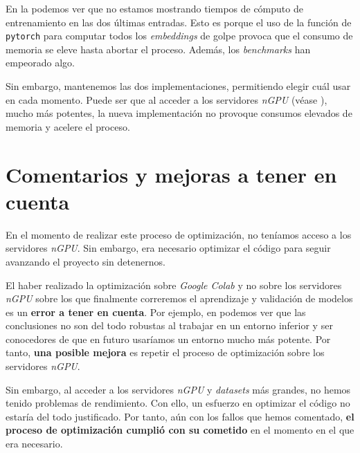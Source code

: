 En la  podemos ver que no estamos mostrando tiempos de cómputo de entrenamiento en las dos últimas entradas. Esto es porque el uso de la función de \lstinline{pytorch} para computar todos los \textit{embeddings} de golpe provoca que el consumo de memoria se eleve hasta abortar el proceso. Además, los \textit{benchmarks} han empeorado algo.

Sin embargo, mantenemos las dos implementaciones, permitiendo elegir cuál usar en cada momento. Puede ser que al acceder a los servidores \textit{nGPU} (véase ), mucho más potentes, la nueva implementación no provoque consumos elevados de memoria y acelere el proceso.

\section{Comentarios y mejoras a tener en cuenta}

En el momento de realizar este proceso de optimización, no teníamos acceso a los servidores \textit{nGPU}. Sin embargo, era necesario optimizar el código para seguir avanzando el proyecto sin detenernos.

El haber realizado la optimización sobre \textit{Google Colab} y no sobre los servidores \textit{nGPU} sobre los que finalmente correremos el aprendizaje y validación de modelos es un \textbf{error a tener en cuenta}. Por ejemplo, en  podemos ver que las conclusiones no son del todo robustas al trabajar en un entorno inferior y ser conocedores de que en futuro usaríamos un entorno mucho más potente. Por tanto, \textbf{una posible mejora} es repetir el proceso de optimización sobre los servidores \textit{nGPU}.

Sin embargo, al acceder a los servidores \textit{nGPU} y \textit{datasets} más grandes, no hemos tenido problemas de rendimiento. Con ello, un esfuerzo en optimizar el código no estaría del todo justificado. Por tanto, aún con los fallos que hemos comentado, \textbf{el proceso de optimización cumplió con su cometido} en el momento en el que era necesario.

